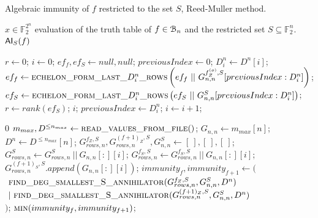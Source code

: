 \documentclass[11pt]{llncs}
\begin{document}
\begin{algorithm}
	\caption{Algebraic immunity of $f$ restricted to the set $S$, Reed-Muller method. \label{alg:RMApproach}}
	\begin{algorithmic}[1]
		\Require $x\in \mathbb{F}_2^{2^n}$ evaluation of the truth table of $f\in \mathcal{B}_{n}$ and the restricted set $S\subseteq \mathbb{F}_2^n$.
		\Ensure $\mathsf{AI}_S(f)$
		
		\State $r \gets 0$;
		\State $i \gets 0$;
		\State $ef_f, ef_S \gets null, null$;
		\State $previousIndex \gets 0$;
		\State $D_i^n \gets D^n[i]$;
		\State $ef_f\gets \mbox{\textsc{echelon\_form\_last\_}}D_i^n\mbox{\textsc{\_rows}}\left(ef_f\ ||\  G_{n,n}^{f_Z^{(o)},S}[previousIndex:D_i^n]\right)$\footnotemark;
		\State $ef_S \gets \mbox{\textsc{echelon\_form\_last\_}}D_i^n\mbox{\textsc{\_rows}}\left(ef_S\ ||\ G_{n,n}^S[previousIndex:D_i^n]\right)$;
		\State $r \gets rank\left(ef_S\right)$;
		\State
		\Return $i$;
		\EndIf
		\State $previousIndex \gets D_i^n$;
		\State $i \gets i+1$;
		\EndWhile
		\EndFunction
		\State
		
		\Return $0$
		\EndIf
		\State $m_{max}, D^{\leq n_{max}}\gets \mbox{\textsc{read\_values\_from\_file}}()$;
		\State $G_{n,n}\gets m_{max}[n]$;
		\State $D^n \gets D^{\leq n_{max}}[n]$;
		\State $G_{rows,n}^{f_Z,S}, G_{rows,n}^{(f+ 1)_Z,S}, G_{n,n}^S \gets [\ ], [\ ], [\ ]$;
		\State $G_{rows,n}^{S} \gets G_{rows,n}^{S}\ ||\ G_{n,n}[:][i]$;
		\State $G_{rows,n}^{f_S,S} \gets G_{rows,n}^{f_S,S}\ ||\ G_{n,n}[:][i]$;
		\Else
		\State $G_{rows,n}^{(f+ 1)_S,S}.append\left(G_{n,n}[:][i]\right)$;
		\EndIf
		\EndIf
		\EndFor
		\State $immunity_f, immunity_{f+1} \leftarrow ($\\
		$\ \mbox{\textsc{find\_deg\_smallest\_S\_annihilator}}(G_{rows,n}^{f_Z,S}, G_{n,n}^S,D^{n})$\\
		$\ |\ \mbox{\textsc{find\_deg\_smallest\_S\_annihilator}}(G_{rows,n}^{(f+ 1)_Z,S}, G_{n,n}^S, D^{n})$\\
		$)$;
		\State \Return $\mbox{\textsc{min}}(immunity_f, immunity_{f+1})$\footnotemark;
	\end{algorithmic}
\end{algorithm}
\end{document}
